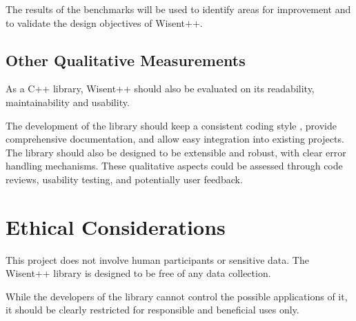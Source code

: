 The results of the benchmarks will be used to identify areas for improvement and to validate the design objectives of Wisent++.


\section{Other Qualitative Measurements}

As a C++ library, Wisent++ should also be evaluated on its readability, maintainability and usability. 

The development of the library should keep a consistent coding style \cite{google_cpp_style}, provide comprehensive documentation, and allow easy integration into existing projects. The library should also be designed to be extensible and robust, with clear error handling mechanisms. These qualitative aspects could be assessed through code reviews, usability testing, and potentially user feedback.


\newpage




\chapter{Ethical Considerations}
\thispagestyle{chapterstyle}

This project does not involve human participants or sensitive data. The Wisent++ library is designed to be free of any data collection. 

While the developers of the library cannot control the possible applications of it, it should be clearly restricted for responsible and beneficial uses only. 

\newpage




\printbibliography
